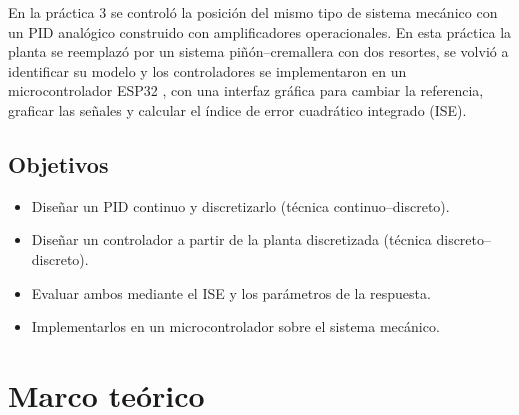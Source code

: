 \documentclass[conference]{IEEEtran}
\begin{document}
En la práctica 3 se controló la posición del mismo tipo de sistema mecánico
con un PID analógico construido con amplificadores operacionales. En esta
práctica la planta se reemplazó por un sistema piñón--cremallera con dos
resortes, se volvió a identificar su modelo y los controladores se
implementaron en un microcontrolador ESP32 \cite{espressif2024}, con una
interfaz gráfica para cambiar la referencia, graficar las señales y calcular
el índice de error cuadrático integrado (ISE).

\subsection{Objetivos}
\begin{itemize}
  \item Diseñar un PID continuo y discretizarlo (técnica continuo--discreto).
  \item Diseñar un controlador a partir de la planta discretizada (técnica
        discreto--discreto).
  \item Evaluar ambos mediante el ISE y los parámetros de la respuesta.
  \item Implementarlos en un microcontrolador sobre el sistema mecánico.
\end{itemize}

\section{Marco teórico}
\end{document}
